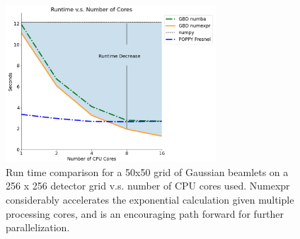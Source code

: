 \begin{figure}[H]
    \centering
    \includegraphics[width=0.7\textwidth]{gbdprofiling.png}
    \caption{Run time comparison for a 50x50 grid of Gaussian beamlets on a 256 x 256 detector grid v.s. number of CPU cores used. Numexpr considerably accelerates the exponential calculation given multiple processing cores, and is an encouraging path forward for further parallelization.}
    \label{fig:runtime_sim}
\end{figure}

